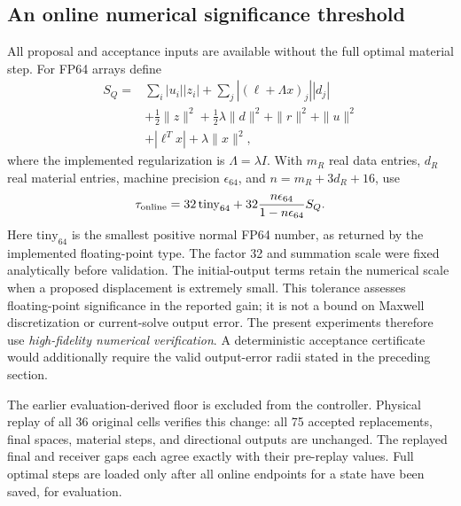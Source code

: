 \subsection{An online numerical significance threshold}
All proposal and acceptance inputs are available without the full optimal material step. For FP64 arrays define
\begin{equation}\label{eq:online-scale}
\begin{split}
S_Q={}&\sum_i|u_i||z_i|+\sum_j|(\ell+\Lambda x)_j||d_j|\\
&+\tfrac12\|z\|^2+\tfrac12\lambda\|d\|^2+\|r\|^2+\|u\|^2\\
&+|\ell^Tx|+\lambda\|x\|^2,
\end{split}
\end{equation}
where the implemented regularization is $\Lambda=\lambda I$. With $m_R$ real data entries, $d_R$ real material entries, machine precision $\epsilon_{64}$, and $n=m_R+3d_R+16$, use
\begin{equation}\label{eq:online-tolerance}
\tau_{\rm online}=32\,\mathrm{tiny}_{64}
+32\frac{n\epsilon_{64}}{1-n\epsilon_{64}}S_Q.
\end{equation}
Here $\mathrm{tiny}_{64}$ is the smallest positive normal FP64 number, as returned by the implemented floating-point type. The factor 32 and summation scale were fixed analytically before validation. The initial-output terms retain the numerical scale when a proposed displacement is extremely small. This tolerance assesses floating-point significance in the reported gain; it is not a bound on Maxwell discretization or current-solve output error. The present experiments therefore use \emph{high-fidelity numerical verification}. A deterministic acceptance certificate would additionally require the valid output-error radii stated in the preceding section.

The earlier evaluation-derived floor is excluded from the controller. Physical replay of all 36 original cells verifies this change: all 75 accepted replacements, final spaces, material steps, and directional outputs are unchanged. The replayed final and receiver gaps each agree exactly with their pre-replay values. Full optimal steps are loaded only after all online endpoints for a state have been saved, for evaluation.

